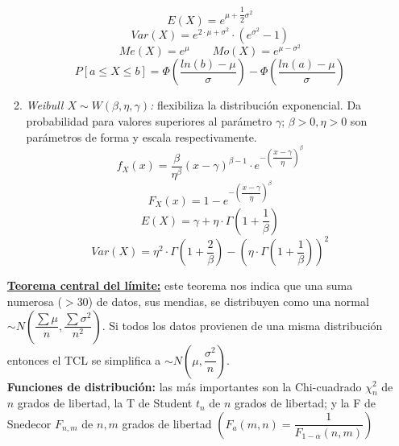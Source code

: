 \documentclass[a4paper, twocolumn, 10pt]{article}
\begin{document}
\begin{itemize}
\begin{enumerate}
		\begin{equation*}
			E(X) = e^{\mu+\dfrac{1}{2}\sigma^2}
		\end{equation*}
		\begin{equation*}
			Var(X) = e^{2\cdot \mu + \sigma^2}\cdot (e^{\sigma^2}-1)
		\end{equation*}
		\begin{equation*}
			Me(X) = e^\mu \qquad Mo(X) = e^{\mu - \sigma^2}
		\end{equation*}
		\begin{equation*}
			P\left[a \leq X \leq b\right] = \Phi\left(\dfrac{ln(b)-\mu}{\sigma}\right)-\Phi\left(\dfrac{ln(a)-\mu}{\sigma}\right)
		\end{equation*}
		\item \textit{Weibull $X \sim W(\beta, \eta, \gamma)$:} flexibiliza la distribución exponencial. Da probabilidad para valores superiores al parámetro $\gamma$; $\beta >0, \eta >0$ son parámetros de forma y escala respectivamente.
		\begin{equation*}
			f_X(x) = \frac{\beta}{\eta^\beta}(x-\gamma)^{\beta-1}\cdot e^{-\left(\dfrac{x-\gamma}{\eta}\right)^\beta}
		\end{equation*}
		\begin{equation*}
			F_X(x) = 1 - e^{-\left(\dfrac{x-\gamma}{\eta}\right)^\beta}
		\end{equation*}
		\begin{equation*}
			E(X) = \gamma + \eta \cdot \Gamma\left(1 + \dfrac{1}{\beta}\right)		
		\end{equation*}
		\begin{equation*}
			Var(X) = \eta^2 \cdot \Gamma\left(1 + \dfrac{2}{\beta}\right)- \left(\eta\cdot \Gamma\left(1+ \dfrac{1}{\beta}\right)\right)^2
		\end{equation*}
	\end{enumerate}
\textbf{\underline{Teorema central del límite:}} este teorema nos indica que una suma numerosa ($>$30) de datos, sus mendias, se distribuyen como una normal $\sim N\left(\dfrac{\sum \mu}{n}, \dfrac{\sum\sigma^2}{n^2}\right)$. Si todos los datos provienen de una misma distribución entonces el TCL se simplifica a $\sim N\left(\mu, \dfrac{\sigma^2}{n}\right)$. \\
\textbf{Funciones de distribución:} las más importantes son la Chi-cuadrado $\chi^2_n$ de $n$ grados de libertad, la T de Student $t_n$ de $n$ grados de libertad; y la F de Snedecor $F_{n,m}$ de $n,m$ grados de libertad $\left(F_a(m,n) = \dfrac{1}{F_{1-\alpha}(n,m)}\right)$
\end{itemize}
\end{document}
